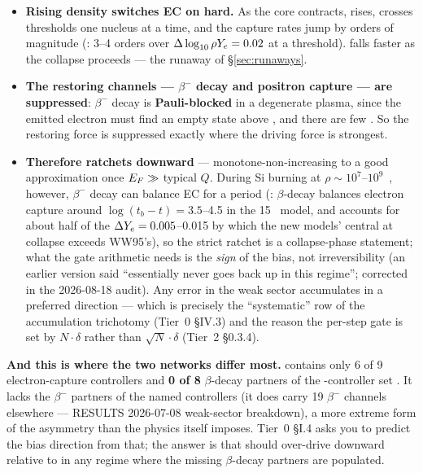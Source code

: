 \begin{itemize}
\item \textbf{Rising density switches EC on hard.} As the core contracts, \eF{}
  rises, crosses thresholds one nucleus at a time, and the capture rates jump
  by orders of magnitude (\citealt{suzuki2016}: 3--4 orders over
  $\Delta\log_{10}\rho Y_{e} = 0.02$ at a threshold). \Ye{} falls faster as the
  collapse proceeds --- the runaway of \S\ref{sec:runaways}.
\item \textbf{The restoring channels --- $\beta^{-}$ decay and positron capture
  --- are suppressed}: $\beta^{-}$ decay is \textbf{Pauli-blocked} in a
  degenerate plasma, since the emitted electron must find an empty state above
  \eF, and there are few \citep{langanke2003a}. So the restoring force is
  suppressed exactly where the driving force is strongest.
\item \textbf{Therefore \Ye{} ratchets downward} --- monotone-non-increasing to
  a good approximation once $E_{F} \gg$ typical $Q$. During Si burning at
  $\rho \sim 10^{7}$--$10^{9}$~\gcc, however, $\beta^{-}$ decay can balance EC
  for a period (\citealt{heger2001}: $\beta$-decay balances electron capture
  around $\log(t_b - t) = 3.5$--4.5 in the 15~\Msun{} model, and accounts for
  about half of the $\Delta Y_{e} = 0.005$--0.015 by which the new models' central
  \Ye{} at collapse exceeds WW95's), so the strict ratchet is a collapse-phase
  statement; what the gate arithmetic needs is the \emph{sign} of the bias, not
  irreversibility (an earlier version said \Ye{} ``essentially never goes back
  up in this regime''; corrected in the 2026-08-18 audit). Any error in the
  weak sector accumulates in a preferred direction --- which is precisely the
  ``systematic'' row of the accumulation trichotomy (Tier~0 \S IV.3) and the
  reason the per-step gate is set by $N\cdot\delta$ rather than
  $\sqrt{N}\cdot\delta$ (Tier~2 \S 0.3.4).
\end{itemize}

\textbf{And this is where the two networks differ most.}  contains only
6 of 9 electron-capture controllers and \textbf{0 of 8} $\beta$-decay partners
of the \Ye-controller set . It lacks the $\beta^{-}$
partners of the named \Ye{} controllers (it does carry 19 $\beta^{-}$ channels
elsewhere --- RESULTS 2026-07-08 weak-sector breakdown), a more extreme form of
the asymmetry than the physics itself imposes. Tier~0 \S I.4 asks you to
predict the bias direction from that; the answer is that  should
over-drive \Ye{} downward relative to  in any regime where the
missing $\beta$-decay partners are populated.

